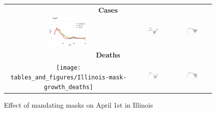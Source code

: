 \documentclass[11pt,reqno,letter]{amsart}
\theoremstyle{definition}
\begin{document}
\begin{figure}[h]
  \caption{Effect of mandating masks on April 1st in Illinois \label{fig:IL-mask}}
  \begin{minipage}{\linewidth}
    \centering
    \begin{tabular}{ccc}
      \multicolumn{3}{c}{\textbf{Cases}} \\
      \includegraphics[width=0.31\textwidth]{tables_and_figures/Illinois-mask-growth}
      &
        \includegraphics[width=0.31\textwidth]{tables_and_figures/Illinois-mask-dgrowth_v1}
      &        \includegraphics[width=0.31\textwidth]{tables_and_figures/Illinois-mask-dcases_v1}      \\
      \multicolumn{3}{c}{\textbf{Deaths}} \\
    \texttt{[image: tables\_and\_figures/Illinois-mask-growth\_deaths]}
      &        \includegraphics[width=0.31\textwidth]{tables_and_figures/Illinois-mask-dgrowth_deaths_v1}
      &      \includegraphics[width=0.31\textwidth]{tables_and_figures/Illinois-mask-dcases_deaths_v1}

\end{tabular}
\end{minipage}
\end{figure}
\end{document}
